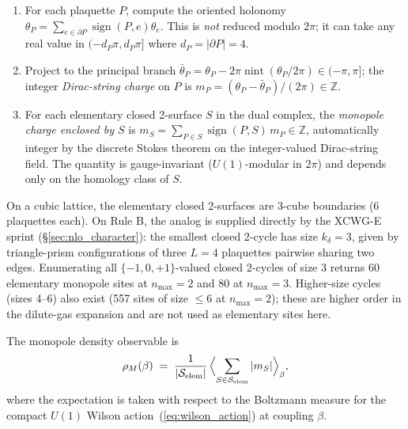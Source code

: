 \documentclass[11pt]{article}
\begin{document}
\begin{enumerate}
\item[(i)] For each plaquette $P$, compute the oriented holonomy
$\theta_P=\sum_{e\in\partial P}\operatorname{sign}(P,e)\theta_e$. This is
\emph{not} reduced modulo $2\pi$; it can take any real value in
$(-d_P\pi,d_P\pi]$ where $d_P=|\partial P|=4$.

\item[(ii)] Project to the principal branch
$\bar\theta_P=\theta_P-2\pi\operatorname{nint}(\theta_P/2\pi)\in(-\pi,\pi]$;
the integer \emph{Dirac-string charge} on $P$ is
$m_P=(\theta_P-\bar\theta_P)/(2\pi)\in\mathbb{Z}$.

\item[(iii)] For each elementary closed 2-surface $S$ in the dual complex,
the \emph{monopole charge enclosed by $S$} is
$m_S=\sum_{P\in S}\operatorname{sign}(P,S)\,m_P\in\mathbb{Z}$, automatically
integer by the discrete Stokes theorem on the integer-valued Dirac-string
field. The quantity is gauge-invariant ($U(1)$-modular in $2\pi$) and depends
only on the homology class of $S$.
\end{enumerate}

On a cubic lattice, the elementary closed 2-surfaces are 3-cube boundaries
(6 plaquettes each). On Rule B, the analog is supplied directly by the
XCWG-E sprint (\S\ref{sec:nlo_character}): the smallest closed 2-cycle has
size $k_\delta=3$, given by triangle-prism configurations of three $L=4$
plaquettes pairwise sharing two edges. Enumerating all $\{-1,0,+1\}$-valued
closed 2-cycles of size 3 returns 60 elementary monopole sites at
$n_\text{max}=2$ and 80 at $n_\text{max}=3$. Higher-size cycles (sizes 4--6)
also exist (557 sites of size $\le 6$ at $n_\text{max}=2$); these are higher
order in the dilute-gas expansion and are not used as elementary sites here.

The monopole density observable is
\begin{equation}
\rho_M(\beta)\;=\;\frac{1}{|\mathcal{S}_\text{elem}|}\,
\Bigl\langle\sum_{S\in\mathcal{S}_\text{elem}}|m_S|\Bigr\rangle_\beta,
\label{eq:rho_M}
\end{equation}
where the expectation is taken with respect to the Boltzmann measure for the
compact $U(1)$ Wilson action~(\ref{eq:wilson_action}) at coupling $\beta$.
\end{document}
